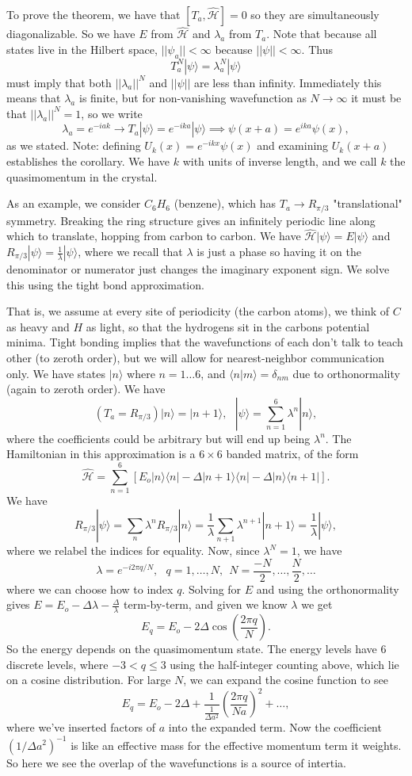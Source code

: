 \documentclass[fontsize=12pt]{scrartcl}
\newcommand{\la}{\langle}
\newcommand{\ra}{\rangle}
\newcommand{\Ham}{\hat{\mathcal{H}}}
\begin{document}
To prove the theorem, we have that $[T_a,\Ham]=0$ so they are simultaneously diagonalizable. So we have $E$ from $\Ham$ and $\lambda_a$ from $T_a$. Note that because all states live in the Hilbert space, $||\psi_a||<\infty$ because $||\psi||<\infty$. Thus $$T_a^N|\psi\ra = \lambda_a^N|\psi\ra$$ must imply that both $||\lambda_a||^N$ and $||\psi||$ are less than infinity. Immediately this means that $\lambda_a$ is finite, but for non-vanishing wavefunction as $N\to \infty$ it must be that $||\lambda_a||^N=1$, so we write $$\lambda_a=e^{-iak}\to T_a|\psi\ra = e^{-ika}|\psi\ra\implies \psi(x+a)=e^{ika}\psi(x),$$ as we stated. Note: defining $U_k(x)=e^{-ikx}\psi(x)$ and examining $U_k(x+a)$ establishes the corollary. We have $k$ with units of inverse length, and we call $k$ the quasimomentum in the crystal.

As an example, we consider $C_6H_6$ (benzene), which has $T_a\to R_{\pi/3}$ "translational" symmetry. Breaking the ring structure gives an infinitely periodic line along which to translate, hopping from carbon to carbon. We have $\Ham|\psi\ra = E|\psi\ra$ and $R_{\pi/3}|\psi\ra=\frac{1}{\lambda}|\psi\ra$, where we recall that $\lambda$ is just a phase so having it on the denominator or numerator just changes the imaginary exponent sign. We solve this using the tight bond approximation. 

That is, we assume at every site of periodicity (the carbon atoms), we think of $C$ as heavy and $H$ as light, so that the hydrogens sit in the carbons potential minima. Tight bonding implies that the wavefunctions of each don't talk to teach other (to zeroth order), but we will allow for nearest-neighbor communication only. We have states $|n\ra$ where $n=1\dots 6$, and $\la n|m\ra=\delta_{nm}$ due to orthonormality (again to zeroth order). We have $$(T_a=R_{\pi/3})|n\ra=|n+1\ra, \ \ \ |\psi\ra=\sum_{n=1}^6 \lambda^n|n\ra,$$ where the coefficients could be arbitrary but will end up being $\lambda^n$. The Hamiltonian in this approximation is a $6\times 6$  banded matrix, of the form $$\Ham=\sum_{n=1}^{6}\left[E_o|n\ra\la n| - \Delta|n+1\ra\la n| - \Delta|n\ra\la n+1|\right].$$ We have $$R_{\pi/3}|\psi\ra=\sum_n \lambda^n R_{\pi/3}|n\ra = \frac{1}{\lambda}\sum_{n+1}\lambda^{n+1}|n+1\ra=\frac{1}{\lambda}|\psi\ra,$$ where we relabel the indices for equality. Now, since $\lambda^N=1$, we have $$\lambda=e^{-i2\pi q/N}, \ \ \ q=1,\dots, N, \ \ N= \frac{-N}{2},\dots,\frac{N}{2}, \dots$$ where we can choose how to index $q$. Solving for $E$ and using the orthonormality gives $E=E_o-\Delta\lambda -\frac{\Delta}{\lambda}$ term-by-term, and given we know $\lambda$ we get $$E_q=E_o-2\Delta\cos\left(\frac{2\pi q}{N}\right).$$ So the energy depends on the quasimomentum state. The energy levels have 6 discrete levels, where $-3<q\leq 3$ using the half-integer counting above, which lie on a cosine distribution. For large $N$, we can expand the cosine function to see $$E_q=E_o-2\Delta +\frac{1}{\frac{1}{\Delta a^2}}\left(\frac{2\pi q}{Na}\right)^2+\dots,$$ where we've inserted factors of $a$ into the expanded term. Now the coefficient $(1/\Delta a^2)^{-1}$ is like an effective mass for the effective momentum term it weights. So here we see the overlap of the wavefunctions is a source of intertia.
\end{document}
